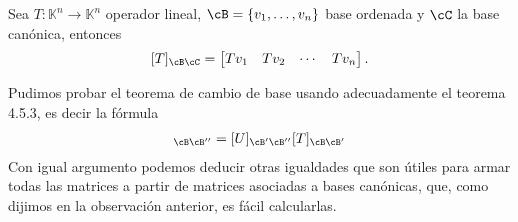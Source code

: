 \documentclass[handout]{beamer} %
\newcommand{\Id}{\operatorname{Id}}
\newcommand{\K}{\mathbb K}
\begin{document}



\begin{frame}

\begin{observacion} Sea $T: \K^n \to \K^n$ operador lineal, $\cB = \{v_1,\ldots,v_n\}$ base ordenada y $\cC$ la base canónica,  entonces 
$$
[T]_{\cB\cC} = \begin{bmatrix}
	Tv_1 & Tv_2 & \cdots &Tv_n
\end{bmatrix}.
$$
\end{observacion}\pause
	

\begin{observacion}
Pudimos probar el teorema de cambio de base usando adecuadamente el teorema 4.5.3, es decir la fórmula
\begin{align*}
	[UT]_{\cB\cB''}=[U]_{\cB'\cB''}[T]_{\cB\cB'}
\end{align*}\pause
Con igual argumento podemos deducir otras igualdades que son útiles para armar todas las matrices a partir de matrices asociadas a bases canónicas, que, como  dijimos en la observación anterior, es fácil calcularlas. 
\end{observacion}
\end{frame}
\end{document}
